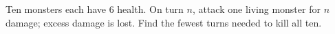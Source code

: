 Ten monsters each have 6 health. On turn $n$, attack one living monster for $n$ damage; excess damage is lost. Find the fewest turns needed to kill all ten.
